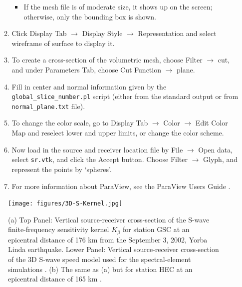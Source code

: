 \begin{enumerate}
\begin{enumerate}
\begin{itemize}
\item If the mesh file is of moderate size, it shows up on the screen; otherwise,
only the bounding box is shown.
\end{itemize}
\item Click \textsf{Display Tab} $\rightarrow$ \textsf{Display Style} $\rightarrow$
\textsf{Representation} and select \textsf{wireframe of surface} to
display it.
\item To create a cross-section of the volumetric mesh, choose \textsf{Filter}
$\rightarrow$ \textsf{cut}, and under \textsf{Parameters Tab}, choose
\textsf{Cut Function} $\rightarrow$ \textsf{plane}.
\item Fill in center and normal information given by the \texttt{global\_slice\_number.pl}
script (either from the standard output or from \texttt{normal\_plane.txt}
file).
\item To change the color scale, go to \textsf{Display Tab} $\rightarrow$
\textsf{Color} $\rightarrow$ \textsf{Edit Color Map} and reselect
lower and upper limits, or change the color scheme.
\item Now load in the source and receiver location file by \textsf{File}
$\rightarrow$ \textsf{Open data}, select \texttt{sr.vt}k, and click
the \textsf{Accept} button. Choose \textsf{Filter} $\rightarrow$
\textsf{Glyph}, and represent the points by `\textsf{spheres}'.
\item For more information about ParaView, see the ParaView Users Guide
.
\end{enumerate}
\end{enumerate}
%
\begin{figure}[H]
\begin{centering}
\texttt{[image: figures/3D-S-Kernel.jpg]}
\par
\end{centering}
\caption{(a) Top Panel: Vertical source-receiver cross-section of the S-wave
finite-frequency sensitivity kernel $K_{\beta}$ for station GSC at
an epicentral distance of 176 km from the September 3, 2002, Yorba
Linda earthquake. Lower Panel: Vertical source-receiver cross-section
of the 3D S-wave speed model used for the spectral-element simulations
\citep{KoLiTrSuStSh04}. (b) The same as (a) but for station HEC at
an epicentral distance of 165 km \citep{LiTr06}.}
\label{figure:P-wave-speed-finite-frequency}
\end{figure}


